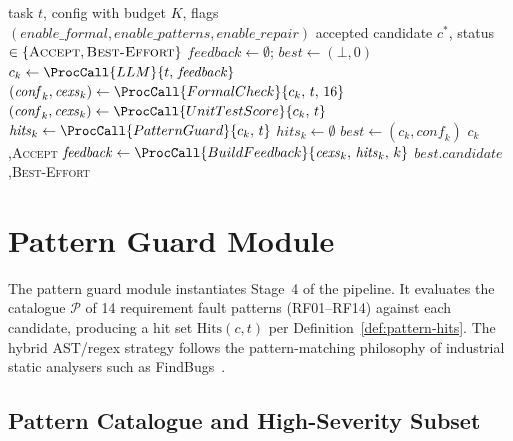 \begin{algorithm}[t]
\caption{Counterexample-Guided Repair Loop}
\label{alg:repair-loop}
\begin{algorithmic}[1]
\Require task $t$, config with budget $K$, flags
         $(\mathit{enable\_formal}, \mathit{enable\_patterns}, \mathit{enable\_repair})$
\Ensure accepted candidate $c^*$, status $\in \{\textsc{Accept}, \textsc{Best-Effort}\}$
\State $\mathit{feedback} \leftarrow \emptyset$;\quad
       $\mathit{best} \leftarrow (\bot, 0)$
  \State $c_k \leftarrow \ProcCall{LLM}{t,\, \mathit{feedback}}$
    \State $(\mathit{conf}_k, \mathit{cexs}_k) \leftarrow
           \ProcCall{FormalCheck}{c_k,\, t,\, 16}$
  \Else
    \State $(\mathit{conf}_k, \mathit{cexs}_k) \leftarrow
           \ProcCall{UnitTestScore}{c_k,\, t}$
  \EndIf
    \State $\mathit{hits}_k \leftarrow \ProcCall{PatternGuard}{c_k,\, t}$
  \Else
    \State $\mathit{hits}_k \leftarrow \emptyset$
  \EndIf
    \State $\mathit{best} \leftarrow (c_k, \mathit{conf}_k)$
  \EndIf
    \State \Return $c_k$,\enspace \textsc{Accept}
  \EndIf
    \State $\mathit{feedback} \leftarrow
           \ProcCall{BuildFeedback}{\mathit{cexs}_k,\, \mathit{hits}_k,\, k}$
  \EndIf
\EndFor
\State \Return $\mathit{best}.\mathit{candidate}$,\enspace \textsc{Best-Effort}
\end{algorithmic}
\end{algorithm}

\section{Pattern Guard Module}
\label{sec:impl:patterns}

The pattern guard module instantiates Stage~4 of the pipeline.  It evaluates
the catalogue $\mathcal{P}$ of 14 requirement fault patterns (RF01--RF14)
against each candidate, producing a hit set $\mathrm{Hits}(c,t)$ per
Definition~\ref{def:pattern-hits}.  The hybrid AST/regex strategy follows
the pattern-matching philosophy of industrial static analysers such as
FindBugs~\citep{hovemeyer2004findbugs,ayewah2008findbugs}.

\subsection{Pattern Catalogue and High-Severity Subset}

